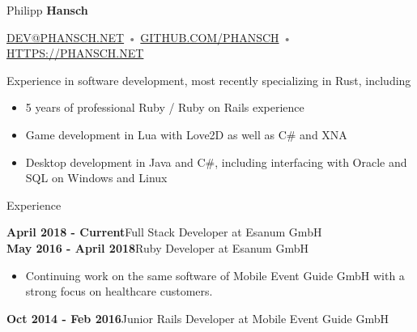 \documentclass[12pt]{article}
\begin{document}
\thispagestyle{empty}



{\Huge Philipp \textbf{Hansch}}

{\footnotesize
  \textcolor{Gray}{
    \href{mailto:dev@phansch.net}{\uppercase{dev@phansch.net}}
    •
    \href{https://github.com/phansch}{\uppercase{github.com/phansch}}
    •
    \href{https://phansch.net}{\uppercase{https://phansch.net}}
  }
}

\vspace{0.5cm}

Experience in software development, most recently specializing in Rust, including

\begin{itemize}
  \setlength{\itemsep}{0cm}
  \setlength{\parskip}{0cm}
  \item 5 years of professional Ruby / Ruby on Rails experience
  \item Game development in Lua with Love2D as well as C\# and XNA
  \item Desktop development in Java and C\#, including interfacing with Oracle and SQL on Windows and Linux
\end{itemize}

{\Large Experience}

\textbf{April 2018 - Current}\hfill Full Stack Developer at Esanum GmbH
\\

\textbf{May 2016 - April 2018}\hfill Ruby Developer at Esanum GmbH

\begin{itemize}
  \setlength{\itemsep}{0cm}
  \setlength{\parskip}{0cm}

  \item Continuing work on the same software of Mobile Event Guide GmbH with a strong focus on healthcare customers.
\end{itemize}

\textbf{Oct 2014 - Feb 2016}\hfill Junior Rails Developer at Mobile Event Guide GmbH
\end{document}
